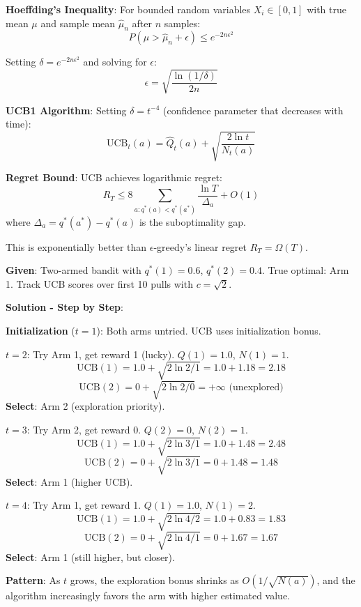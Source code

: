 \documentclass[11pt,a4paper]{article}
\begin{document}
\begin{tcolorbox}[colback=yellow!5!white,colframe=yellow!75!black,title=\textbf{UCB Theoretical Foundation}]
\textbf{Hoeffding's Inequality}: For bounded random variables $X_i \in [0,1]$ with true mean $\mu$ and sample mean $\hat{\mu}_n$ after $n$ samples:
\[
P(\mu > \hat{\mu}_n + \epsilon) \leq e^{-2n\epsilon^2}
\]

Setting $\delta = e^{-2n\epsilon^2}$ and solving for $\epsilon$:
\[
\epsilon = \sqrt{\frac{\ln(1/\delta)}{2n}}
\]

\textbf{UCB1 Algorithm}: Setting $\delta = t^{-4}$ (confidence parameter that decreases with time):
\[
\text{UCB}_t(a) = \hat{Q}_t(a) + \sqrt{\frac{2\ln t}{N_t(a)}}
\]

\textbf{Regret Bound}: UCB achieves logarithmic regret:
\[
R_T \leq 8 \sum_{a: q^*(a) < q^*(a^*)} \frac{\ln T}{\Delta_a} + O(1)
\]
where $\Delta_a = q^*(a^*) - q^*(a)$ is the suboptimality gap.

This is exponentially better than $\epsilon$-greedy's linear regret $R_T = \Omega(T)$.
\end{tcolorbox}

\begin{tcolorbox}[colback=green!5!white,colframe=green!75!black,title=\textbf{Worked Example: UCB Dynamics Over Time}]
\textbf{Given}: Two-armed bandit with $q^*(1) = 0.6$, $q^*(2) = 0.4$. True optimal: Arm 1. Track UCB scores over first 10 pulls with $c=\sqrt{2}$.

\textbf{Solution - Step by Step}:

\textbf{Initialization} ($t=1$): Both arms untried. UCB uses initialization bonus.

\textbf{$t=2$}: Try Arm 1, get reward 1 (lucky). $Q(1)=1.0$, $N(1)=1$.
\[
\text{UCB}(1) = 1.0 + \sqrt{2\ln 2/1} = 1.0 + 1.18 = 2.18
\]
\[
\text{UCB}(2) = 0 + \sqrt{2\ln 2/0} = +\infty \text{ (unexplored)}
\]
\textbf{Select}: Arm 2 (exploration priority).

\textbf{$t=3$}: Try Arm 2, get reward 0. $Q(2)=0$, $N(2)=1$.
\[
\text{UCB}(1) = 1.0 + \sqrt{2\ln 3/1} = 1.0 + 1.48 = 2.48
\]
\[
\text{UCB}(2) = 0 + \sqrt{2\ln 3/1} = 0 + 1.48 = 1.48
\]
\textbf{Select}: Arm 1 (higher UCB).

\textbf{$t=4$}: Try Arm 1, get reward 1. $Q(1)=1.0$, $N(1)=2$.
\[
\text{UCB}(1) = 1.0 + \sqrt{2\ln 4/2} = 1.0 + 0.83 = 1.83
\]
\[
\text{UCB}(2) = 0 + \sqrt{2\ln 4/1} = 0 + 1.67 = 1.67
\]
\textbf{Select}: Arm 1 (still higher, but closer).

\textbf{Pattern}: As $t$ grows, the exploration bonus shrinks as $O(1/\sqrt{N(a)})$, and the algorithm increasingly favors the arm with higher estimated value.
\end{tcolorbox}
\end{document}
